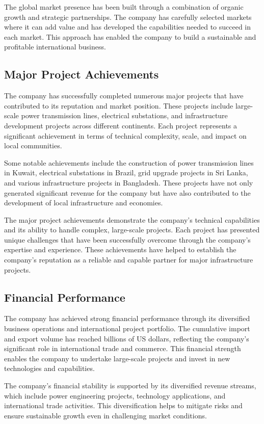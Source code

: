 The global market presence has been built through a combination of organic growth and strategic partnerships. The company has carefully selected markets where it can add value and has developed the capabilities needed to succeed in each market. This approach has enabled the company to build a sustainable and profitable international business.

\subsection{Major Project Achievements}
The company has successfully completed numerous major projects that have contributed to its reputation and market position. These projects include large-scale power transmission lines, electrical substations, and infrastructure development projects across different continents. Each project represents a significant achievement in terms of technical complexity, scale, and impact on local communities.

Some notable achievements include the construction of power transmission lines in Kuwait, electrical substations in Brazil, grid upgrade projects in Sri Lanka, and various infrastructure projects in Bangladesh. These projects have not only generated significant revenue for the company but have also contributed to the development of local infrastructure and economies.

The major project achievements demonstrate the company's technical capabilities and its ability to handle complex, large-scale projects. Each project has presented unique challenges that have been successfully overcome through the company's expertise and experience. These achievements have helped to establish the company's reputation as a reliable and capable partner for major infrastructure projects.

\subsection{Financial Performance}
The company has achieved strong financial performance through its diversified business operations and international project portfolio. The cumulative import and export volume has reached billions of US dollars, reflecting the company's significant role in international trade and commerce. This financial strength enables the company to undertake large-scale projects and invest in new technologies and capabilities.

The company's financial stability is supported by its diversified revenue streams, which include power engineering projects, technology applications, and international trade activities. This diversification helps to mitigate risks and ensure sustainable growth even in challenging market conditions.

